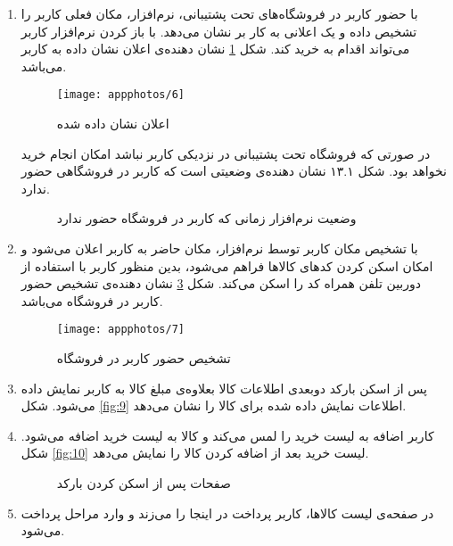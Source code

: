 \documentclass[oneside]{report}
\begin{document}
\begin{enumerate}
	\item با حضور کاربر در فروشگاه‌های تحت پشتیبانی،  نرم‌افزار،   مکان فعلی کاربر را تشخیص داده و یک اعلانی به کار بر نشان می‌دهد. با باز کردن نرم‌افزار کاربر می‌تواند اقدام به خرید ‌کند. 
شکل 
\ref{fig:6}
نشان‌ دهنده‌ی اعلان نشان داده به کاربر می‌باشد. 
\begin{figure}[h!]
	\centering
	\texttt{[image: appphotos/6]}
	\caption{اعلان نشان داده شده}
	\label{fig:6}
\end{figure}
	در صورتی که فروشگاه تحت پشتیبانی در نزدیکی کاربر نباشد امکان انجام خرید نخواهد بود. شکل ۱۳.۱ نشان دهنده‌ی وضعیتی است که کاربر در فروشگاهی حضور ندارد. 
		\begin{figure}[h!]
		\begin{center}
			\caption{وضعیت نرم‌افزار زمانی که کاربر در فروشگاه حضور ندارد}
		\end{center}
\label{fig:58}
	\end{figure}	
	
	\newpage
	
	\item با تشخیص مکان کاربر توسط نرم‌افزار، مکان حاضر به کاربر اعلان می‌شود و  امکان اسکن کردن کد‌های کالاها فراهم می‌شود،   بدین منظور کاربر با استفاده از دوربین تلفن همراه کد
	   		     		 {\normalsize{}}
	  			 				 را اسکن می‌کند. شکل 
	  			 				 \ref{fig:7}
	  			 				 نشان دهنده‌ی تشخیص حضور کاربر در فروشگاه می‌باشد.	 				 
	 \begin{figure}[h]
	 	\centering
	 	\texttt{[image: appphotos/7]}
	 	\caption{تشخیص حضور کاربر در فروشگاه}
	 	\label{fig:7}
	 \end{figure}
	  			 				 		 				
	\newpage  			 				
	  			 				
	\item پس از اسکن بارکد دوبعدی اطلاعات کالا بعلاوه‌ی مبلغ کالا به کاربر نمایش داده می‌شود.
شکل 
\ref{fig:9}
اطلاعات نمایش داده شده برای کالا را نشان می‌دهد.
	
	\item کاربر اضافه به لیست خرید را لمس می‌کند و کالا به لیست خرید اضافه می‌شود.
شکل 
\ref{fig:10}
لیست خرید بعد از اضافه کردن کالا را نمایش می‌دهد. 
	
	
	\newpage
	
		\begin{figure}[h!]
		\begin{center}
			\caption{صفحات پس از اسکن کردن بارکد}
		\end{center}
	\end{figure}

\newpage

	\item در صفحه‌ی لیست کالاها، کاربر پرداخت در اینجا را می‌زند و وارد مراحل پرداخت می‌شود.
\end{enumerate}
		   
\end{document}
